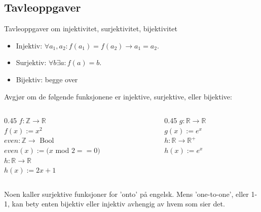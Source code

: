 \subsection{Tavleoppgaver}
\begin{frame}{Tavleoppgaver om injektivitet, surjektivitet, bijektivitet}
    \begin{itemize}
        \item Injektiv:  $\forall a_1, a_2 : f(a_1) = f(a_2) \rightarrow a_1 = a_2$.\\
        \item Surjektiv: $\forall b \exists a : f(a) = b$.\\
        \item Bijektiv: begge over \\
    \end{itemize}
    \pause
    \begin{block}{Avgjør om de følgende funksjonene er injektive, surjektive, eller bijektive:}
        \begin{columns}
            \begin{column}{0.45\textwidth}
                $f : \mathbb{Z} \rightarrow \mathbb{R}$\\
                $f(x) := x^2$\\[1mm]
                \pause
                $even : \mathbb{Z} \rightarrow $ Bool\\
                $even(x) := (x$ mod $2 == 0)$\\[1mm]
                \pause
                $h : \mathbb{R} \rightarrow \mathbb{R}$\\
                $h(x) := 2x + 1$\\[1mm]
            \end{column}
            \pause
            \begin{column}{0.45\textwidth}
                $g : \mathbb{R} \rightarrow \mathbb{R}$\\
                $g(x) := e^x$\\[1mm]
                \pause
                $h : \mathbb{R} \rightarrow \mathbb{R}^+$\\
                $h(x) := e^x$
            \end{column}
        \end{columns}
    \end{block}
    \pause
    Noen kaller surjektive funksjoner for 'onto' på engelsk. Mens 'one-to-one', eller 1-1, kan bety enten bijektiv eller injektiv avhengig av hvem som sier det.
\end{frame}